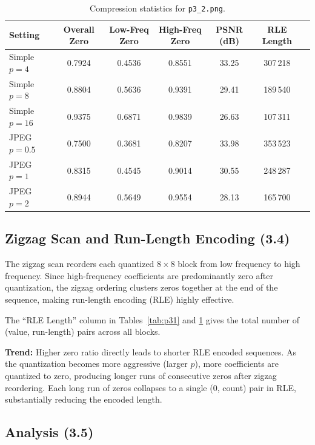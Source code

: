 \documentclass[11pt,a4paper]{article}
\begin{document}
\begin{table}[H]
\centering
\caption{Compression statistics for \texttt{p3\_2.png}.}
\label{tab:p32}
\begin{tabular}{lcccccc}
\toprule
Setting & Overall Zero & Low-Freq Zero & High-Freq Zero & PSNR (dB) & RLE Length \\
\midrule
Simple $p=4$    & 0.7924 & 0.4536 & 0.8551 & 33.25 & 307\,218 \\
Simple $p=8$    & 0.8804 & 0.5636 & 0.9391 & 29.41 & 189\,540 \\
Simple $p=16$   & 0.9375 & 0.6871 & 0.9839 & 26.63 & 107\,311 \\
\midrule
JPEG $p=0.5$    & 0.7500 & 0.3681 & 0.8207 & 33.98 & 353\,523 \\
JPEG $p=1$      & 0.8315 & 0.4545 & 0.9014 & 30.55 & 248\,287 \\
JPEG $p=2$      & 0.8944 & 0.5649 & 0.9554 & 28.13 & 165\,700 \\
\bottomrule
\end{tabular}
\end{table}

\subsection{Zigzag Scan and Run-Length Encoding (3.4)}

The zigzag scan reorders each quantized $8\times 8$ block from low frequency to high frequency.  Since high-frequency coefficients are predominantly zero after quantization, the zigzag ordering clusters zeros together at the end of the sequence, making run-length encoding (RLE) highly effective.

The ``RLE Length'' column in Tables~\ref{tab:p31} and \ref{tab:p32} gives the total number of (value, run-length) pairs across all blocks.

\textbf{Trend:}  Higher zero ratio directly leads to shorter RLE encoded sequences.  As the quantization becomes more aggressive (larger $p$), more coefficients are quantized to zero, producing longer runs of consecutive zeros after zigzag reordering.  Each long run of zeros collapses to a single (0, count) pair in RLE, substantially reducing the encoded length.

\subsection{Analysis (3.5)}
\end{document}
